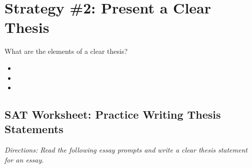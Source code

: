 \section{Strategy \#2: Present a Clear Thesis}

What are the elements of a clear thesis?

\begin{spacing}{1.5}
\begin{itemize}
\item \hrulefill
\item \hrulefill
\item \hrulefill
\end{itemize}
\end{spacing}

\subsection{SAT Worksheet: Practice Writing Thesis Statements}

\textit{Directions: Read the following essay prompts and write a clear thesis statement for an essay.}


